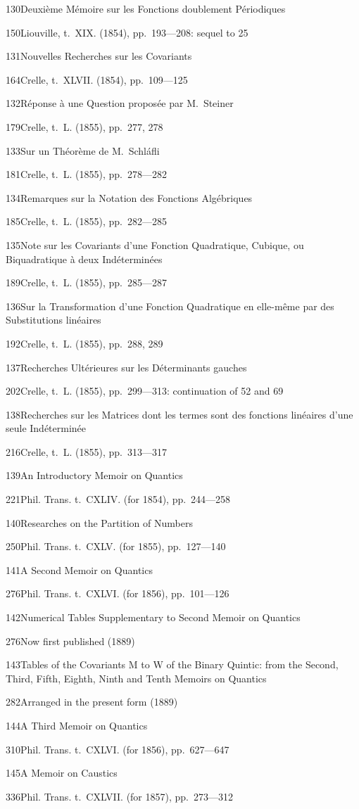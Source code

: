 \documentclass[11pt,a4paper]{book}
\providecommand{\tocentry}[2]{#1\dotfill #2\par}
\begin{document}
\tocentry{130}{Deuxi\`{e}me M\'{e}moire sur les Fonctions doublement P\'{e}riodiques}{150}{Liouville, t.~XIX. (1854), pp.~193---208: sequel to 25}

\tocentry{131}{Nouvelles Recherches sur les Covariants}{164}{Crelle, t.~XLVII. (1854), pp.~109---125}

\tocentry{132}{R\'{e}ponse \`{a} une Question propos\'{e}e par M.~Steiner}{179}{Crelle, t.~L. (1855), pp.~277, 278}

\tocentry{133}{Sur un Th\'{e}or\`{e}me de M.~Schl\'{a}fli}{181}{Crelle, t.~L. (1855), pp.~278---282}

\tocentry{134}{Remarques sur la Notation des Fonctions Alg\'{e}briques}{185}{Crelle, t.~L. (1855), pp.~282---285}

\tocentry{135}{Note sur les Covariants d'une Fonction Quadratique, Cubique, ou Biquadratique \`{a} deux Ind\'{e}termin\'{e}es}{189}{Crelle, t.~L. (1855), pp.~285---287}

\tocentry{136}{Sur la Transformation d'une Fonction Quadratique en elle-m\^{e}me par des Substitutions lin\'{e}aires}{192}{Crelle, t.~L. (1855), pp.~288, 289}

\tocentry{137}{Recherches Ult\'{e}rieures sur les D\'{e}terminants gauches}{202}{Crelle, t.~L. (1855), pp.~299---313: continuation of 52 and 69}

\tocentry{138}{Recherches sur les Matrices dont les termes sont des fonctions lin\'{e}aires d'une seule Ind\'{e}termin\'{e}e}{216}{Crelle, t.~L. (1855), pp.~313---317}

\tocentry{139}{An Introductory Memoir on Quantics}{221}{Phil. Trans. t.~CXLIV. (for 1854), pp.~244---258}

\tocentry{140}{Researches on the Partition of Numbers}{250}{Phil. Trans. t.~CXLV. (for 1855), pp.~127---140}

\newpage

\tocentry{141}{A Second Memoir on Quantics}{276}{Phil. Trans. t.~CXLVI. (for 1856), pp.~101---126}

\tocentry{142}{Numerical Tables Supplementary to Second Memoir on Quantics}{276}{Now first published (1889)}

\tocentry{143}{Tables of the Covariants M to W of the Binary Quintic: from the Second, Third, Fifth, Eighth, Ninth and Tenth Memoirs on Quantics}{282}{Arranged in the present form (1889)}

\tocentry{144}{A Third Memoir on Quantics}{310}{Phil. Trans. t.~CXLVI. (for 1856), pp.~627---647}

\tocentry{145}{A Memoir on Caustics}{336}{Phil. Trans. t.~CXLVII. (for 1857), pp.~273---312}
\end{document}
